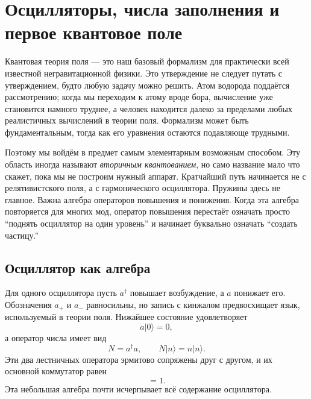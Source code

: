 \chapter{Осцилляторы, числа заполнения и первое квантовое поле}

Квантовая теория поля — это наш базовый формализм для практически всей известной негравитационной физики. Это утверждение не следует путать с утверждением, будто любую задачу можно решить. Атом водорода поддаётся рассмотрению; когда мы переходим к атому вроде бора, вычисление уже становится намного труднее, а человек находится далеко за пределами любых реалистичных вычислений в теории поля. Формализм может быть фундаментальным, тогда как его уравнения остаются подавляюще трудными.

Поэтому мы войдём в предмет самым элементарным возможным способом. Эту область иногда называют \emph{вторичным квантованием}, но само название мало что скажет, пока мы не построим нужный аппарат. Кратчайший путь начинается не с релятивистского поля, а с гармонического осциллятора. Пружины здесь не главное. Важна алгебра операторов повышения и понижения. Когда эта алгебра повторяется для многих мод, оператор повышения перестаёт означать просто ``поднять осциллятор на один уровень'' и начинает буквально означать ``создать частицу.''

\section{Осциллятор как алгебра}

Для одного осциллятора пусть \(a^\dagger\) повышает возбуждение, а \(a\) понижает его. Обозначения \(a_+\) и \(a_-\) равносильны, но запись с кинжалом предвосхищает язык, используемый в теории поля. Нижайшее состояние удовлетворяет
\begin{equation}
a|0\rangle=0,
\end{equation}
а оператор числа имеет вид
\begin{equation}
N=a^\dagger a,
\qquad
N|n\rangle=n|n\rangle.
\end{equation}
Эти два лестничных оператора эрмитово сопряжены друг с другом, и их основной коммутатор равен
\begin{equation}
[a,a^\dagger]=1.
\label{eq:l06-single-commutator}
\end{equation}
Эта небольшая алгебра почти исчерпывает всё содержание осциллятора.

